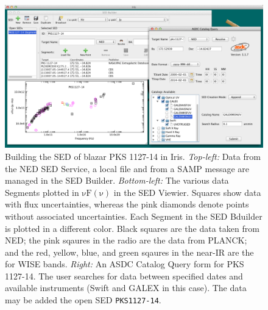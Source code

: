 \documentclass[preprint,12pt,3p]{elsarticle}
\begin{document}
\begin{figure}[h!]
\begin{center}
\includegraphics[width=0.7\columnwidth]{figures/built-in-visuals-loading1/built-in-visuals-loading1.png}
\caption{\textbf{\textit{\label{fig:load_data}} } Building the SED of blazar PKS 1127-14 in Iris. \textit{Top-left:} Data from the NED SED Service, a local file and from a SAMP message are managed in the SED Builder. \textit{Bottom-left:} The various data Segments plotted in $\mathrm{\nu F \left( \nu \right)}$ in the SED Viewier. Squares show data with flux uncertainties, whereas the pink diamonds denote points without associated uncertainties. Each Segment in the SED Bduilder is plotted in a different color. Black squares are the data taken from NED; the pink sqaures in the radio are the data from PLANCK; and the red, yellow, blue, and green sqaures in the near-IR are the for WISE bands. \textit{Right:} An ASDC Catalog Query form for PKS 1127-14. The user searches for data between specified dates and available instruments (Swift and GALEX in this case). The data may be added the open SED \texttt{PKS1127-14}.}
\end{center}
\end{figure}
\end{document}
